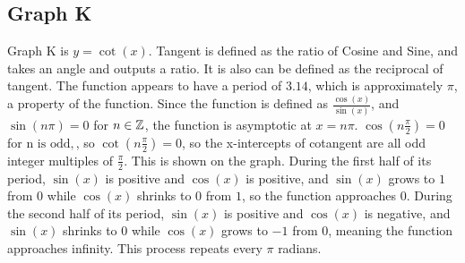 \subsection{Graph K}

Graph K is ${y=\cot(x)}$.
Tangent is defined as the ratio of Cosine and Sine, and takes an angle and outputs a ratio.
It is also can be defined as the reciprocal of tangent.
The function appears to have a period of $3.14$, which is approximately $\pi$, a property of the function.
Since the function is defined as ${\frac{\cos(x)}{\sin(x)}}$, and ${\sin(n\pi)=0}$ for ${n \in \mathbb{Z}}$, the function is asymptotic at ${x=n\pi}$.
${\cos(n\frac{\pi}{2})=0}$ for ${\text{n is odd}, }$, so ${\cot(n\frac{\pi}{2})=0}$, so the x-intercepts of cotangent are all odd integer multiples of ${\frac{\pi}{2}}$.
This is shown on the graph.
During the first half of its period, ${\sin(x)}$ is positive and ${\cos(x)}$ is positive, and ${\sin(x)}$ grows to $1$ from $0$ while ${\cos(x)}$ shrinks to $0$ from $1$, so the function approaches $0$.
During the second half of its period, ${\sin(x)}$ is positive and ${\cos(x)}$ is negative, and ${\sin(x)}$ shrinks to $0$ while ${\cos(x)}$ grows to $-1$ from $0$, meaning the function approaches infinity.
This process repeats every $\pi$ radians.
